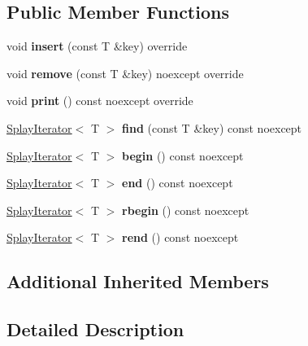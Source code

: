 \subsection*{Public Member Functions}
\begin{DoxyCompactItemize}
\item 
\mbox{\label{classSplayTree_a855f0e55be8ad7d01f5b0330ee0025b0}} 
void {\bfseries insert} (const T \&key) override
\item 
\mbox{\label{classSplayTree_a5bdc3f8e97386b08e9526f4f93def2cf}} 
void {\bfseries remove} (const T \&key) noexcept override
\item 
\mbox{\label{classSplayTree_a5299790551c2576d621ebc47f47f413d}} 
void {\bfseries print} () const noexcept override
\item 
\mbox{\label{classSplayTree_a97b654c8ebfb8e780dc4a46fb1e1197a}} 
\hyperlink{classSplayIterator}{Splay\+Iterator}$<$ T $>$ {\bfseries find} (const T \&key) const noexcept
\item 
\mbox{\label{classSplayTree_afb4da5395fe3815703b7741e92b50fdd}} 
\hyperlink{classSplayIterator}{Splay\+Iterator}$<$ T $>$ {\bfseries begin} () const noexcept
\item 
\mbox{\label{classSplayTree_a9aff68b59f341ff1a9455101836d9e44}} 
\hyperlink{classSplayIterator}{Splay\+Iterator}$<$ T $>$ {\bfseries end} () const noexcept
\item 
\mbox{\label{classSplayTree_a073db12fe9a7269cf09c284a5960d0e0}} 
\hyperlink{classSplayIterator}{Splay\+Iterator}$<$ T $>$ {\bfseries rbegin} () const noexcept
\item 
\mbox{\label{classSplayTree_aeab592029a72feadab4b848ebc7e3665}} 
\hyperlink{classSplayIterator}{Splay\+Iterator}$<$ T $>$ {\bfseries rend} () const noexcept
\end{DoxyCompactItemize}
\subsection*{Additional Inherited Members}


\subsection{Detailed Description}
